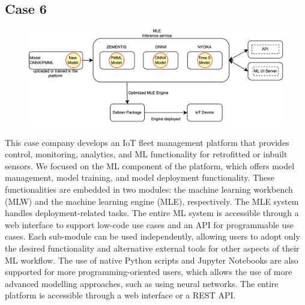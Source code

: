 \subsection*{Case 6} %
\label{case: 6}
\DIFaddbegin \begin{figure}[b]
\centering
\includegraphics[width=\linewidth]{images/case6_deployment_process.png}
\caption{}
\label{fig: case6_deployment_process}
\end{figure}

\DIFaddend %
\DIFdelbegin %

{%
}
\DIFdelend 

This case company develops an IoT fleet management platform that provides control, monitoring, analytics, and ML functionality for retrofitted or inbuilt sensors. We focused on the ML component of the platform, which offers model management, model training, and model deployment functionality. These functionalities are embedded in two modules: the machine learning workbench (MLW) and the machine learning engine (MLE), respectively. The MLE system handles deployment-related tasks. The entire ML system is accessible through a web interface to support low-code use cases and an API for programmable use cases. Each sub-module can be used independently, allowing users to adopt only the desired functionality and alternative external tools for other aspects of their ML workflow. The use of native Python scripts and Jupyter Notebooks are also supported for more programming-oriented users, which allows the use of more advanced modelling approaches, such as using neural networks. The entire platform is accessible through a web interface or a REST API. %

